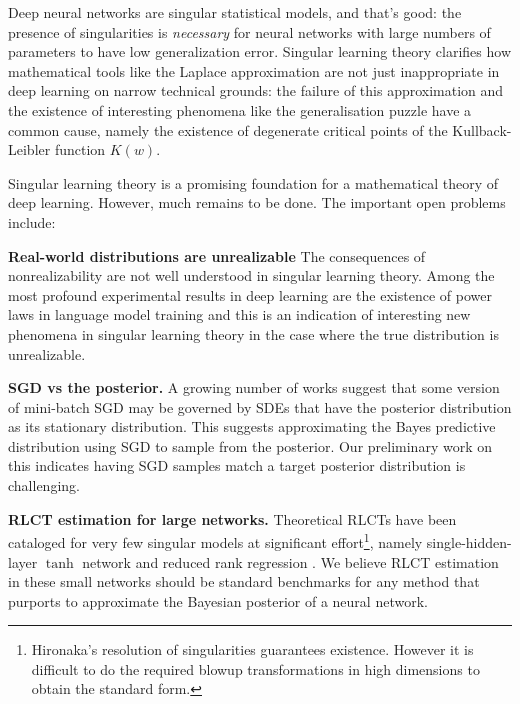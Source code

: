 \documentclass{article} %
\begin{document}
Deep neural networks are singular statistical models, and that's good: the presence of singularities is \emph{necessary} for neural networks with large numbers of parameters to have low generalization error. Singular learning theory clarifies how mathematical tools like the Laplace approximation are not just inappropriate in deep learning on narrow technical grounds: the failure of this approximation and the existence of interesting phenomena like the generalisation puzzle have a common cause, namely the existence of degenerate critical points of the Kullback-Leibler function $K(w)$. 

Singular learning theory is a promising foundation for a mathematical theory of deep learning. However, much remains to be done. The important open problems include:

\textbf{Real-world distributions are unrealizable}
The consequences of nonrealizability are not well understood in singular learning theory. Among the most profound experimental results in deep learning are the existence of power laws in language model training \cite{??} and this is an indication of interesting new phenomena in singular learning theory in the case where the true distribution is unrealizable.

\textbf{SGD vs the posterior.} A growing number of works \citep{Simsekli17,mandt_stochastic_2018,smith_stochastic_2018} suggest that some version of mini-batch SGD may be governed by SDEs that have the posterior distribution as its stationary distribution. This suggests approximating the Bayes predictive distribution using SGD to sample from the posterior. Our preliminary work on this indicates having SGD samples match a target posterior distribution is challenging.

\textbf{RLCT estimation for large networks.} 
Theoretical RLCTs have been cataloged for very few singular models at significant effort\footnote{Hironaka's resolution of singularities guarantees existence. However it is difficult to do the required blowup transformations in high dimensions to obtain the standard form.}, namely single-hidden-layer $\tanh$ network \citep{aoyagi_resolution_2006} and reduced rank regression \citep{aoyagi_stochastic_2005}. We believe RLCT estimation in these small networks should be standard benchmarks for any method that purports to approximate the Bayesian posterior of a neural network.
\end{document}
